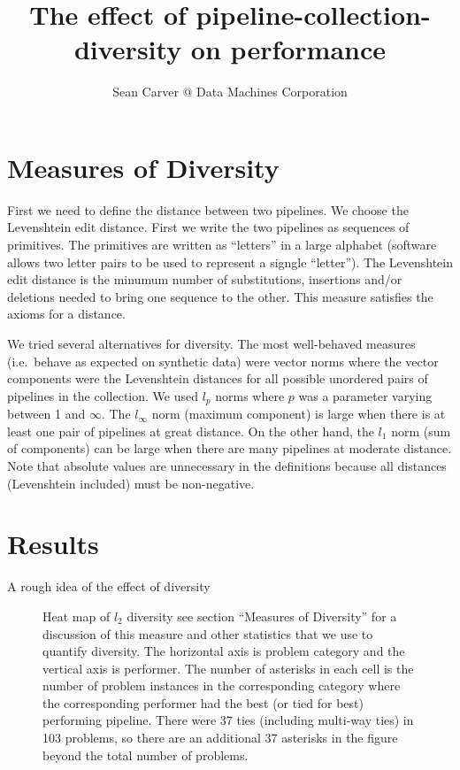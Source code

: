 \documentclass{article}
\title{The effect of pipeline-collection-diversity on performance}
\author{Sean Carver @ Data Machines Corporation}
\begin{document}
\maketitle


\section{Measures of Diversity}
First we need to define the distance between two pipelines.  We choose
the Levenshtein edit distance.  First we write the two pipelines as
sequences of primitives.  The primitives are written as ``letters'' in
a large alphabet (software allows two letter pairs to be used to
represent a signgle ``letter'').  The Levenshtein edit distance is the
minumum number of substitutions, insertions and/or deletions needed to
bring one sequence to the other.  This measure satisfies the axioms
for a distance.

We tried several alternatives for diversity.  The most well-behaved
measures (i.e.\ behave as expected on synthetic data) were vector
norms where the vector components were the Levenshtein distances for
all possible unordered pairs of pipelines in the collection.  We used
$l_p$ norms where $p$ was a parameter varying between 1 and $\infty$.
The $l_\infty$ norm (maximum component) is large when there is at
least one pair of pipelines at great distance.  On the other hand, the
$l_1$ norm (sum of components) can be large when there are many
pipelines at moderate distance.  Note that absolute values are
unnecessary in the definitions because all distances (Levenshtein
included) must be non-negative.

\section{Results}
A rough idea of the effect of diversity
\begin{figure}
\caption{Heat map of $l_2$ diversity see section ``Measures of
  Diversity'' for a discussion of this measure and other statistics
  that we use to quantify diversity.  The horizontal axis is problem
  category and the vertical axis is performer.  The number of
  asterisks in each cell is the number of problem instances in the
  corresponding category where the corresponding performer had the
  best (or tied for best) performing pipeline.  There were 37 ties
  (including multi-way ties) in 103 problems, so there are an
  additional 37 asterisks in the figure beyond the total number of
  problems.}
\end{figure}
\end{document}
